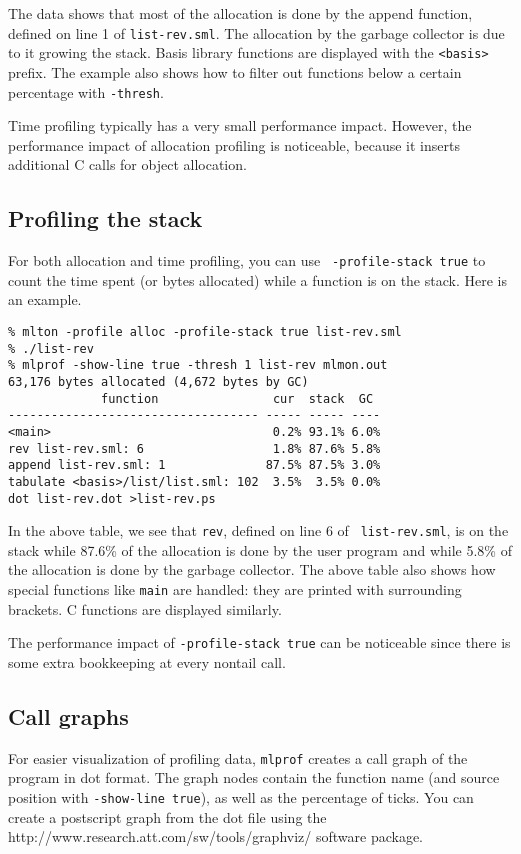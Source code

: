 The data shows that most of the allocation is done by the append
function, defined on line 1 of {\tt list-rev.sml}.  The allocation by
the garbage collector is due to it growing the stack.  Basis library
functions are displayed with the {\tt <basis>} prefix.  The example
also shows how to filter out functions below a certain percentage with
{\tt -thresh}.

Time profiling typically has a very small performance impact.
However, the performance impact of allocation profiling is noticeable,
because it inserts additional C calls for object allocation.

\subsection{Profiling the stack}

For both allocation and time profiling, you can use {\tt
-profile-stack true} to count the time spent (or bytes allocated)
while a function is on the stack.  Here is an example.

\begin{verbatim}
% mlton -profile alloc -profile-stack true list-rev.sml
% ./list-rev
% mlprof -show-line true -thresh 1 list-rev mlmon.out
63,176 bytes allocated (4,672 bytes by GC)
             function                cur  stack  GC 
----------------------------------- ----- ----- ----
<main>                               0.2% 93.1% 6.0%
rev list-rev.sml: 6                  1.8% 87.6% 5.8%
append list-rev.sml: 1              87.5% 87.5% 3.0%
tabulate <basis>/list/list.sml: 102  3.5%  3.5% 0.0%
dot list-rev.dot >list-rev.ps
\end{verbatim}

In the above table, we see that {\tt rev}, defined on line 6 of {\tt
list-rev.sml}, is on the stack while 87.6\% of the allocation is done
by the user program and while 5.8\% of the allocation is done by the
garbage collector.  The above table also shows how special functions
like {\tt main} are handled: they are printed with surrounding
brackets.  C functions are displayed similarly.

The performance impact of {\tt -profile-stack true} can be noticeable
since there is some extra bookkeeping at every nontail call.

\subsection{Call graphs}

For easier visualization of profiling data, {\tt mlprof} creates a
call graph of the program in dot format.  The graph nodes contain the
function name (and source position with {\tt -show-line true}), as
well as the percentage of ticks.  You can create a postscript graph
from the dot file using the
		  {http://www.research.att.com/sw/tools/graphviz/}
software package.

